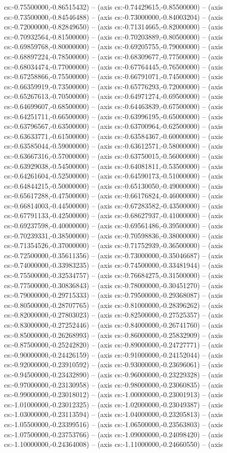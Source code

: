 cs:-0.75500000,-0.86515432) -- (axis cs:-0.74429615,-0.85500000) -- (axis cs:-0.73500000,-0.84546488) -- (axis cs:-0.73000000,-0.84003204) -- (axis cs:-0.72000000,-0.82849650) -- (axis cs:-0.71314665,-0.82000000) -- (axis cs:-0.70932564,-0.81500000) -- (axis cs:-0.70203889,-0.80500000) -- (axis cs:-0.69859768,-0.80000000) -- (axis cs:-0.69205755,-0.79000000) -- (axis cs:-0.68897224,-0.78500000) -- (axis cs:-0.68309677,-0.77500000) -- (axis cs:-0.68034474,-0.77000000) -- (axis cs:-0.67764445,-0.76500000) -- (axis cs:-0.67258866,-0.75500000) -- (axis cs:-0.66791071,-0.74500000) -- (axis cs:-0.66359919,-0.73500000) -- (axis cs:-0.65776293,-0.72000000) -- (axis cs:-0.65267613,-0.70500000) -- (axis cs:-0.64971274,-0.69500000) -- (axis cs:-0.64699607,-0.68500000) -- (axis cs:-0.64463839,-0.67500000) -- (axis cs:-0.64251711,-0.66500000) -- (axis cs:-0.63996195,-0.65000000) -- (axis cs:-0.63796567,-0.63500000) -- (axis cs:-0.63700964,-0.62500000) -- (axis cs:-0.63633771,-0.61500000) -- (axis cs:-0.63584367,-0.60000000) -- (axis cs:-0.63585044,-0.59000000) -- (axis cs:-0.63612571,-0.58000000) -- (axis cs:-0.63667316,-0.57000000) -- (axis cs:-0.63750015,-0.56000000) -- (axis cs:-0.63929038,-0.54500000) -- (axis cs:-0.64081811,-0.53500000) -- (axis cs:-0.64261604,-0.52500000) -- (axis cs:-0.64590173,-0.51000000) -- (axis cs:-0.64844215,-0.50000000) -- (axis cs:-0.65130050,-0.49000000) -- (axis cs:-0.65617288,-0.47500000) -- (axis cs:-0.66176824,-0.46000000) -- (axis cs:-0.66814003,-0.44500000) -- (axis cs:-0.67283582,-0.43500000) -- (axis cs:-0.67791133,-0.42500000) -- (axis cs:-0.68627937,-0.41000000) -- (axis cs:-0.69237598,-0.40000000) -- (axis cs:-0.69561486,-0.39500000) -- (axis cs:-0.70239331,-0.38500000) -- (axis cs:-0.70598836,-0.38000000) -- (axis cs:-0.71354526,-0.37000000) -- (axis cs:-0.71752939,-0.36500000) -- (axis cs:-0.72500000,-0.35611356) -- (axis cs:-0.73000000,-0.35046687) -- (axis cs:-0.74000000,-0.33983235) -- (axis cs:-0.74500000,-0.33481944) -- (axis cs:-0.75500000,-0.32534757) -- (axis cs:-0.76684275,-0.31500000) -- (axis cs:-0.77500000,-0.30836843) -- (axis cs:-0.78000000,-0.30451270) -- (axis cs:-0.79000000,-0.29715333) -- (axis cs:-0.79500000,-0.29368087) -- (axis cs:-0.80500000,-0.28707765) -- (axis cs:-0.81000000,-0.28396262) -- (axis cs:-0.82000000,-0.27803023) -- (axis cs:-0.82500000,-0.27525357) -- (axis cs:-0.83000000,-0.27252446) -- (axis cs:-0.84000000,-0.26741760) -- (axis cs:-0.85000000,-0.26268993) -- (axis cs:-0.86000000,-0.25832909) -- (axis cs:-0.87500000,-0.25242820) -- (axis cs:-0.89000000,-0.24727771) -- (axis cs:-0.90000000,-0.24426159) -- (axis cs:-0.91000000,-0.24152044) -- (axis cs:-0.92000000,-0.23910592) -- (axis cs:-0.93000000,-0.23696061) -- (axis cs:-0.94500000,-0.23432890) -- (axis cs:-0.96000000,-0.23229328) -- (axis cs:-0.97000000,-0.23130958) -- (axis cs:-0.98000000,-0.23060835) -- (axis cs:-0.99000000,-0.23018012) -- (axis cs:-1.00000000,-0.23001913) -- (axis cs:-1.01000000,-0.23012325) -- (axis cs:-1.02000000,-0.23049387) -- (axis cs:-1.03000000,-0.23113594) -- (axis cs:-1.04000000,-0.23205813) -- (axis cs:-1.05500000,-0.23399516) -- (axis cs:-1.06500000,-0.23563803) -- (axis cs:-1.07500000,-0.23753766) -- (axis cs:-1.09000000,-0.24098420) -- (axis cs:-1.10000000,-0.24364008) -- (axis cs:-1.11000000,-0.24660550) -- (axis 